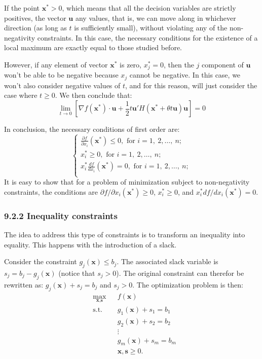 \documentclass[0pt, a4paper]{article}
\begin{document}
If the point $\textbf{x}^*>0$, which means that all the decision variables are strictly positives, the vector $\textbf{u}$ any values, that is, we can move along in whichever direction (as long as $t$ is sufficiently small), without violating any of the non-negativity constraints. In this case, the necessary conditions for the existence of a local maximum are exactly equal to those studied before.

However, if any element of vector $\textbf{x}^*$ is zero, $x_j^*=0$, then the $j$ component of $\textbf{u}$ won't be able to be negative because $x_j$ cannot be negative. In this case, we won't also consider negative values of $t$, and for this reason, will just consider the case where $t\geq0$. We then conclude that: 
$$\lim_{t\to0}\left[\nabla f(\textbf{x}^*)\cdot\textbf{u}+\frac{1}{2}t\textbf{u}'H(\textbf{x}^*+\theta t\textbf{u})\textbf{u}\right]=0$$

In conclusion, the necessary conditions of first order are:
$$
\begin{cases}
	\frac{\partial f}{\partial x_i}(\textbf{x}^*)\leq0,\text{ for }i=1,\ 2,\dots,\ n;\\
	x^*_i\geq0,\text{ for }i=1,\ 2,\dots,\ n;\\
	x^*_i\frac{df}{dx_i}(\textbf{x}^*)=0,\text{ for }i=1,\ 2,\dots,\ n;\\
\end{cases}
$$
It is easy to show that for a problem of minimization subject to non-negativity constraints, the conditions are $\partial f/\partial x_i (\textbf{x}^*)\geq0$, $x^*_i\geq0$, and $x^*_i df/dx_i(\textbf{x}^*)=0$.

\subsubsection*{9.2.2 Inequality constraints}

The idea to address this type of constraints is to transform an inequality into equality. This happens with the introduction of a slack.

Consider the constraint $g_j(\textbf{x})\leq b_j$. The associated slack variable is $s_j=b_j-g_j(\textbf{x})$ (notice that $s_j>0$). The original constraint can therefor be rewritten as: $g_j(\textbf{x})+s_j=b_j$ and $s_j>0$. The optimization problem is then:
\begin{equation*}
\begin{aligned}
& \underset{\textbf{x},\textbf{s}}{\text{max}}
& & f(\textbf{x}) \\
& \text{s.t.}
& & g_1(\textbf{x})+s_1= b_1\\
& & & g_2(\textbf{x})+s_2= b_2\\
& & & \vdots\\
& & & g_m(\textbf{x})+s_m= b_m\\
& & & \textbf{x},\textbf{s}\geq0.
\end{aligned}
\end{equation*}
\end{document}
